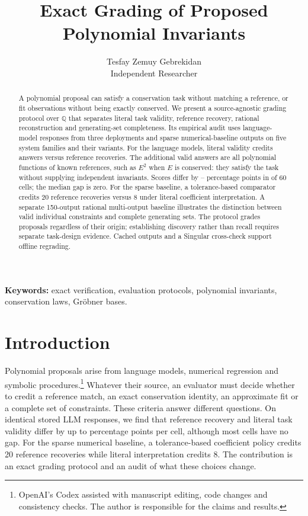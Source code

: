 \documentclass[10pt]{article}
\title{Exact Grading of Proposed Polynomial Invariants}
\author{Tesfay Zemuy Gebrekidan\\
  Independent Researcher}
\begin{document}
\maketitle
\begin{abstract}
A polynomial proposal can satisfy a conservation task without matching a reference, or fit observations without being exactly conserved. We present a source-agnostic grading protocol over $\mathbb{Q}$ that separates literal task validity, reference recovery, rational reconstruction and generating-set completeness. Its empirical audit uses \nLLM{} language-model responses from three deployments and \nBaseline{} sparse numerical-baseline outputs on five system families and their variants. For the language models, literal validity credits \nFirstValid{} answers versus \nExact{} reference recoveries. The \nNonReference{} additional valid answers are all polynomial functions of known references, such as $E^2$ when $E$ is conserved: they satisfy the task without supplying independent invariants. Scores differ by \minGap{}--\maxGap{} percentage points in \nGapCells{} of 60 cells; the median gap is zero. For the sparse baseline, a tolerance-based comparator credits 20 reference recoveries versus 8 under literal coefficient interpretation. A separate 150-output rational multi-output baseline illustrates the distinction between valid individual constraints and complete generating sets. The protocol grades proposals regardless of their origin; establishing discovery rather than recall requires separate task-design evidence. Cached outputs and a Singular cross-check support offline regrading.
\end{abstract}

\noindent\textbf{Keywords:} exact verification, evaluation protocols, polynomial invariants, conservation laws, Gr\"obner bases.

\section{Introduction}

Polynomial proposals arise from language models, numerical regression and symbolic procedures.\footnote{OpenAI's Codex assisted with manuscript editing, code changes and consistency checks. The author is responsible for the claims and results.} Whatever their source, an evaluator must decide whether to credit a reference match, an exact conservation identity, an approximate fit or a complete set of constraints. These criteria answer different questions. On identical stored LLM responses, we find that reference recovery and literal task validity differ by up to \maxGap{} percentage points per cell, although most cells have no gap. For the sparse numerical baseline, a tolerance-based coefficient policy credits 20 reference recoveries while literal interpretation credits 8. The contribution is an exact grading protocol and an audit of what these choices change.
\end{document}
